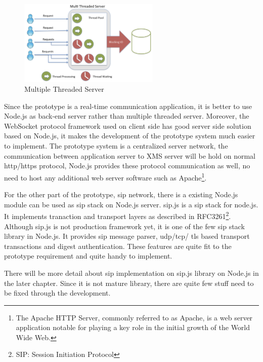 \begin{figure}
	\centering
    	\includegraphics[width=0.60\textwidth,natwidth=610,natheight=642]{figs/threading_java.png}
  	\caption{Multiple Threaded Server\cite{strongloop:nodejs}}
  	\label{fig:threading_java}
\end{figure}

\par Since the prototype is a real-time communication application, it is better to use Node.js as back-end server rather than multiple threaded server. Moreover, the WebSocket protocol framework used on client side has good server side solution based on Node.js, it makes the development of the prototype system much easier to implement. The prototype system is a centralized server network, the communication between application server to XMS server will be hold on normal \gls{http}/\gls{https} protocol, Node.js provides these protocol communication as well, no need to host any additional web server software such as Apache\footnote{The Apache HTTP Server, commonly referred to as Apache, is a web server application notable for playing a key role in the initial growth of the World Wide Web.\cite{wiki:apache}}.

\par For the other part of the prototype, \gls{sip} network, there is a existing Node.js module can be used as \gls{sip} stack on Node.js server. sip.js is a \gls{sip} stack for node.js. It implements tranaction and transport layers as described in RFC3261\footnote{SIP: Session Initiation Protocol}.\cite{github:sipjs} Although sip.js is not production framework yet, it is one of the few \gls{sip} stack library in Node.js. It provides \gls{sip} message parser, \gls{udp}/\gls{tcp}/ \gls{tls} based transport
transactions and digest authentication. These features are quite fit to the prototype requirement and quite handy to implement.

\par There will be more detail about \gls{sip} implementation on sip.js library on Node.js in the later chapter. Since it is not mature library, there are quite few stuff need to be fixed through the development.

